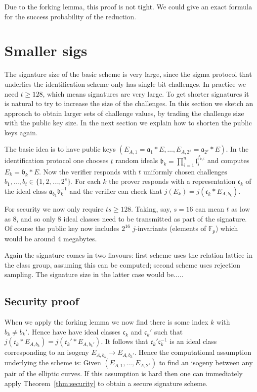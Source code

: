 \documentclass{llncs}
\newcommand{\F}{\mathbb{F}}
\renewcommand{\a}{\mathfrak{a}}
\renewcommand{\b}{\mathfrak{b}}
\renewcommand{\c}{\mathfrak{c}}
\renewcommand{\l}{\mathfrak{l}}
\begin{document}
Due to the forking lemma, this proof is not tight. We could give an exact formula for the success probability of the reduction.



\section{Smaller sigs}


The signature size of the basic scheme is very large, since the sigma protocol that underlies the identification scheme only has single bit challenges. 
In practice we need $t \ge 128$, which means signatures are very large.
To get shorter signatures it is natural to try to increase the size of the challenges.
In this section we sketch an approach to obtain larger sets of challenge values, by trading the challenge size with the public key size. In the next section we explain how to shorten the public keys again.


The basic idea is to have public keys $( E_{A,1} = \a_1 * E , \dots , E_{A,2^s} = \a_{2^s} * E )$.
In the identification protocol one chooses $t$ random ideals $\b_k = \prod_{i=1}^n \l_i^{f_{k,i}}$ and computes $E_k = \b_k * E$.
Now the verifier responds with $t$ uniformly chosen challenges $b_1, \dots, b_t \in \{1, 2, \dots, 2^s \}$.
For each $k$ the prover responds with a representation $\c_k$ of the ideal class $\a_{b_k} \b_k^{-1}$ and the verifier can check that $j( E_k ) = j( \c_k * E_{A, b_k})$.

For security we now only require $ts \ge 128$. Taking, say, $s = 16$ can mean $t$ as low as 8, and so only 8 ideal classes need to be transmitted as part of the signature.
Of course the public key now includes $2^{16}$ $j$-invariants (elements of $\F_p$) which would be around 4 megabytes.

Again the signature comes in two flavours: first scheme uses the relation lattice in the class group, assuming this can be computed; second scheme uses rejection sampling.
The signature size in the latter case would be.....

\subsection{Security proof}

When we apply the forking lemma we now find there is some index $k$ with $b_k \ne b_k'$.
Hence have have ideal classes $\c_k$ and $\c_k'$ such that $j( \c_k * E_{A, b_k} ) = j( \c_k' * E_{A, b_k'})$. It follows that $\c_k' \c_k^{-1}$ is an ideal class corresponding to an isogeny $E_{A,b_k} \to E_{A,b_k'}$.
Hence the computational assumption underlying the scheme is:
Given $(E_{A,1}, \dots, E_{A,2^s} )$ to find an isogeny between any pair of the elliptic curves.
If this assumption is hard then one can immediately apply Theorem~\ref{thm:security} to obtain a secure signature scheme.
\end{document}
